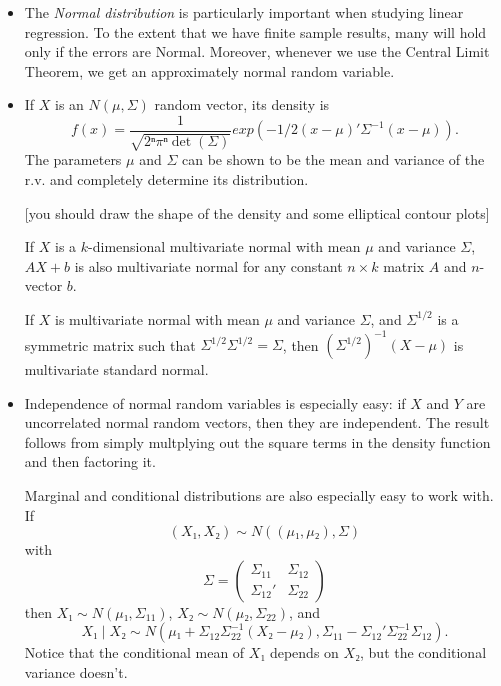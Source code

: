 \begin{itemize}

\item The \emph{Normal distribution} is particularly important when
  studying linear regression.  To the extent that we have finite
  sample results, many will hold only if the errors are Normal.
  Moreover, whenever we use the Central Limit Theorem, we get an
  approximately normal random variable.

\item If $X$ is an $N(μ, Σ)$ random vector, its density is
  \begin{equation*}
    f(x) = \frac{1}{\sqrt{2ⁿ πⁿ \det(Σ)}} exp(-1/2(x - μ)'Σ^{-1}(x- μ)).
  \end{equation*}
  The parameters $μ$ and $Σ$ can be shown to be the mean and variance
  of the r.v. and completely determine its distribution.

  [you should draw the shape of the density and some elliptical
  contour plots]

  If $X$ is a $k$-dimensional multivariate normal with mean $μ$
  and variance $Σ$, $A X + b$ is also multivariate normal for any
  constant $n × k$ matrix $A$ and $n$-vector $b$.

  If $X$ is multivariate normal with mean $μ$ and variance $Σ$,
  and $Σ^{1/2}$ is a symmetric matrix such that $Σ^{1/2} Σ^{1/2} = Σ$,
  then $(Σ^{1/2})^{-1} (X - μ)$ is multivariate standard normal.

\item Independence of normal random variables is especially easy: if
  $X$ and $Y$ are uncorrelated normal random vectors, then they are
  independent.  The result follows from simply multplying out the
  square terms in the density function and then factoring it.

  Marginal and conditional distributions are also especially easy to
  work with.  If 
  \begin{equation*}
    (X₁,X₂) ∼ N((μ₁,μ₂), Σ)
  \end{equation*}
  with
  \begin{equation*}
    Σ = \begin{pmatrix}
      Σ_{11} & Σ_{12} \\ Σ_{12}' & Σ_{22}
    \end{pmatrix}
  \end{equation*}
  then $X₁ ∼ N(μ₁, Σ_{11})$, $X₂ ∼ N(μ₂, Σ_{22})$, and
  \begin{equation*}    
    X₁ ∣ X₂ ∼ N(μ₁ + Σ_{12} Σ_{22}^{-1} (X₂ - μ₂),
               Σ_{11} - Σ_{12}'Σ_{22}^{-1} Σ_{12}).
  \end{equation*}
  Notice that the conditional mean of $X₁$ depends on $X₂$, but the
  conditional variance doesn't.


\end{itemize}
